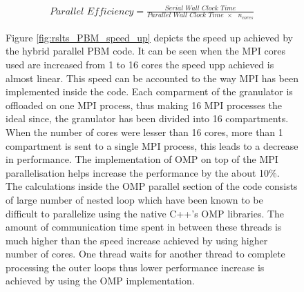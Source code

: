 \documentclass[preprint,11pt,authoryear]{elsarticle}
\begin{document}
\begin{align}
\textit{Parallel Efficiency} = \frac{\textit{Serial Wall Clock Time}}{\textit{Parallel Wall Clock Time $\times$ $n_{cores}$}}
\label{eqn:rslts_PBM_parallel_efficiency}
\end{align}
\begin{figure}[H]
Figure \ref{fig:rslts_PBM_speed_up} depicts the speed up achieved by the hybrid parallel PBM code. It 
can be seen when the MPI cores used are increased from 1 to 16 cores the speed upp achieved is 
almost linear. This speed can be accounted to the way MPI has been implemented inside the code. 
Each comparment of the granulator is  offloaded on one MPI process, thus making 16 MPI processes 
the ideal since, the granulator has been divided into 16 compartments. When the number of cores 
were lesser than 16 cores, more than 1 compartment is sent to a single MPI process, this leads to a 
decrease in performance. The implementation of OMP on top of the MPI parallelisation helps increase 
the performance by the about 10\%. The calculations inside the OMP parallel section of the code 
consists of large number of nested loop which have been known to be difficult to parallelize 
\citep{He2016} using the native C++'s OMP libraries. The amount of communication time spent in 
between these threads is much higher than the speed increase achieved by using higher number of 
cores. One thread waits for another thread to complete processing the outer loops thus lower 
performance increase is achieved by using the OMP implementation. \\


\end{figure}
\end{document}
